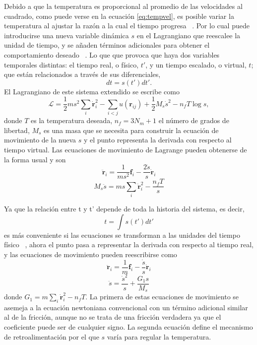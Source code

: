 Debido a que la temperatura es proporcional al promedio de las velocidades al 
cuadrado, como puede verse en la ecuación \ref{eq:tempvel}, es posible variar
la temperatura al ajustar la razón a la cual el tiempo progresa 
~\cite{nose1984a}. Por lo cual puede introducirse una nueva variable dinámica
$s$ en el Lagrangiano que reescalee la unidad de tiempo, y se añaden términos 
adicionales para obtener el comportamiento deseado ~\cite{rapaport2004}. Lo que 
que provoca que haya dos variables temporales distintas: el tiempo real, o físico, 
$t'$, y un tiempo escalado, o virtual, $t$; que están relacionados a través de 
sus diferenciales,
\begin{equation*}
dt = s(t') dt'.
\end{equation*}
El Lagrangiano de este sistema extendido se escribe como
\begin{equation*}
\mathcal{L} = \frac{1}{2} m s^2 \sum_i \dot{\mathbf{r}}_i^2 - \sum_{i<j} u(\mathbf{r}_{ij}) + \frac{1}{2} M_s \dot{s}^2 - n_f T \log s,
\end{equation*}
donde $T$ es la temperatura deseada, $n_f = 3N_m + 1$ el número de grados de 
libertad, $M_s$ es una masa que se necesita para construir la ecuación de 
movimiento de la nueva  $s$ y el punto representa la derivada
con respecto al tiempo virtual. Las ecuaciones de movimiento de Lagrange pueden 
obtenerse de la forma usual y son
\begin{equation*}
\ddot{\mathbf{r}}_i = \frac{1}{m s^2} \mathbf{f}_i - \frac{2 \dot{s}}{s} \dot{\mathbf{r}}_i
\end{equation*}
\begin{equation*}
M_s \ddot{s} = m s \sum_i \dot{\mathbf{r}}_i^2 - \frac{n_f T}{s}
\end{equation*}

Ya que la relación entre t y t' depende de toda la historia del sistema, es decir,
\begin{equation*}
t = \int s(t') dt'
\end{equation*}
es más conveniente si las ecuaciones se transforman a las unidades del tiempo
físico ~\cite{nose1984b, hoover1985}, ahora el punto pasa a representar la 
derivada con respecto al tiempo real, y las ecuaciones de movimiento pueden 
reescribirse como
\begin{equation*}
\ddot{\mathbf{r}}_i = \frac{1}{m} \mathbf{f}_i - \frac{\dot{s}}{s} \dot{\mathbf{r}}_i
\end{equation*}
\begin{equation*}
\ddot{s} = \frac{\dot{s}^2}{s} + \frac{G_1 s}{M_s} 
\end{equation*}
donde $G_1 = m \sum_i \dot{\mathbf{r}}_i^2 - n_f T$. La primera de estas 
ecuaciones de movimiento se asemeja a la ecuación newtoniana convencional con un 
término adicional similar al de la fricción, aunque no se trata de una fricción 
verdadera ya que el coeficiente puede ser de cualquier signo. La segunda ecuación 
define el mecanismo de retroalimentación por el que $s$ varía para regular la 
temperatura.

